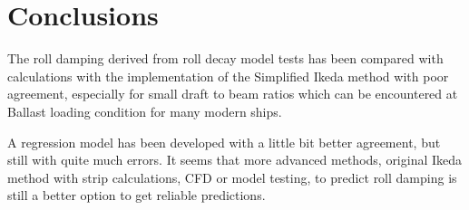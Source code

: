 \section{Conclusions}
\label{se:conclusions}

The roll damping derived from roll decay model tests has been compared with calculations with the implementation of the Simplified Ikeda method with poor agreement, especially for small draft to beam ratios which can be encountered at Ballast loading condition for many modern ships.

A regression model has been developed with a little bit better agreement, but still with quite much errors. It seems that more advanced methods, original Ikeda method with strip calculations, CFD or model testing, to predict roll damping is still a better option to get reliable predictions.  

